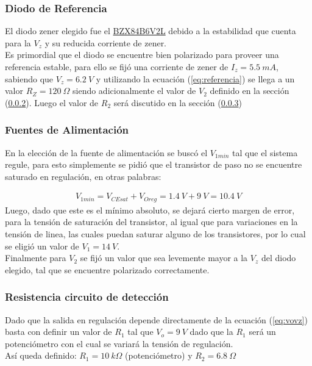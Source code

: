 \subsubsection{Diodo de Referencia}
El diodo zener elegido fue el \href{https://d1d2qsbl8m0m72.cloudfront.net/en/products/databook/datasheet/discrete/diode/zener/bzx84b6v2lt116-e.pdf}{BZX84B6V2L}
debido a la estabilidad que cuenta para la $V_z$ y su reducida corriente de zener.\\
Es primordial que el diodo se encuentre bien polarizado para proveer una referencia estable, para ello se fijó una corriente de zener de $I_z =5.5 \ mA$, sabiendo que $V_z=6.2 \ V$  y utilizando la ecuación (\ref{eq:referencia}) se llega a un valor $R_Z=120 \ \Omega$ siendo adicionalmente el valor de $V_2$ definido en la sección (\ref{sec:fuentes}).
Luego el valor de $R_2$ será discutido en la sección (\ref{sec:resdet})
\subsubsection{Fuentes de Alimentación}
\label{sec:fuentes}
En la elección de la fuente de alimentación se buscó el $V_{1min}$ tal que el sistema regule, para esto simplemente se pidió que el transistor de paso no se encuentre saturado en regulación, en otras palabras:

\begin{align}
V_{1min}=V_{CEsat}+V_{Oreg}= 1.4 \ V+9 \ V=10.4 \ V
\end{align}
Luego, dado que este es el mínimo absoluto, se dejará cierto margen de error, para la tensión de saturación del transistor, al igual que para variaciones en la tensión de linea, las cuales puedan saturar alguno de los transistores, por lo cual se eligió un valor de $V_1=14 \ V$.\\
Finalmente para $V_2$ se fijó un valor que sea levemente mayor a la $V_z$ del diodo elegido, tal que se encuentre polarizado correctamente.

\subsubsection{Resistencia circuito de detección}
\label{sec:resdet}
Dado que la salida en regulación depende directamente de la ecuación (\ref{eq:vovz}) basta con definir un valor de $R_1$ tal que $V_o=9 \ V$ dado que la $R_1$ será un potenciómetro con el cual se variará la tensión de regulación.\\ Así queda definido: $R_1= 10 \ k\Omega$ (potenciómetro) y $R_2=6.8  \  \Omega$
